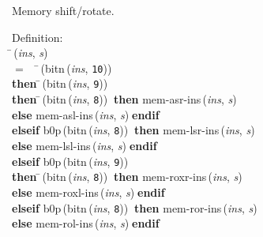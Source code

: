  Memory shift/rotate.
\begin{tabbing}{\sc Definition}: \\  
\=\,({\it{ins\/}}, {\it{s\/}}) \\ 
$=$$\;\;\;\;$\=\,({\rm{bitn}}\,({\it{ins\/}}, {\tt{10}})) \\ 
{\bf then }\=\,({\rm{bitn}}\,({\it{ins\/}}, {\tt{9}})) \\ 
{\bf then }\=\,({\rm{bitn}}\,({\it{ins\/}}, {\tt{8}}))$\;\;${\bf then }{\rm{mem-asr-ins}}\,({\it{ins\/}}, {\it{s\/}}) \\ 
{\bf else }{\rm{mem-asl-ins}}\,({\it{ins\/}}, {\it{s\/}})$\;${\bf  endif}\- \\ 
{\bf elseif }{\rm{b0p}}\,({\rm{bitn}}\,({\it{ins\/}}, {\tt{8}}))$\;\;${\bf then }{\rm{mem-lsr-ins}}\,({\it{ins\/}}, {\it{s\/}}) \\ 
{\bf else }{\rm{mem-lsl-ins}}\,({\it{ins\/}}, {\it{s\/}})$\;${\bf  endif}\- \\ 
{\bf elseif }{\rm{b0p}}\,({\rm{bitn}}\,({\it{ins\/}}, {\tt{9}})) \\ 
{\bf then }\=\,({\rm{bitn}}\,({\it{ins\/}}, {\tt{8}}))$\;\;${\bf then }{\rm{mem-roxr-ins}}\,({\it{ins\/}}, {\it{s\/}}) \\ 
{\bf else }{\rm{mem-roxl-ins}}\,({\it{ins\/}}, {\it{s\/}})$\;${\bf  endif}\- \\ 
{\bf elseif }{\rm{b0p}}\,({\rm{bitn}}\,({\it{ins\/}}, {\tt{8}}))$\;\;${\bf then }{\rm{mem-ror-ins}}\,({\it{ins\/}}, {\it{s\/}}) \\ 
{\bf else }{\rm{mem-rol-ins}}\,({\it{ins\/}}, {\it{s\/}})$\;${\bf  endif}\-\-
\end{tabbing}

